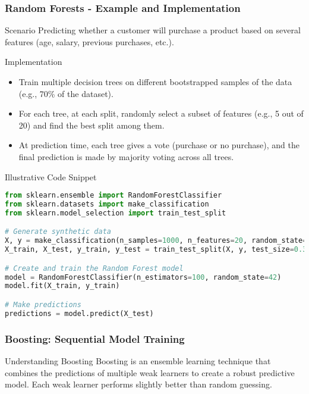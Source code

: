 \documentclass[aspectratio=169]{beamer}
\begin{document}
\begin{frame}[fragile]
    \frametitle{Random Forests - Example and Implementation}
    \begin{block}{Scenario}
        Predicting whether a customer will purchase a product based on several features (age, salary, previous purchases, etc.).
    \end{block}

    \begin{block}{Implementation}
        \begin{itemize}
            \item Train multiple decision trees on different bootstrapped samples of the data (e.g., 70\% of the dataset).
            \item For each tree, at each split, randomly select a subset of features (e.g., 5 out of 20) and find the best split among them.
            \item At prediction time, each tree gives a vote (purchase or no purchase), and the final prediction is made by majority voting across all trees.
        \end{itemize}
    \end{block}
    
    \begin{block}{Illustrative Code Snippet}
        \begin{lstlisting}[language=Python]
from sklearn.ensemble import RandomForestClassifier
from sklearn.datasets import make_classification
from sklearn.model_selection import train_test_split

# Generate synthetic data
X, y = make_classification(n_samples=1000, n_features=20, random_state=42)
X_train, X_test, y_train, y_test = train_test_split(X, y, test_size=0.3, random_state=42)

# Create and train the Random Forest model
model = RandomForestClassifier(n_estimators=100, random_state=42)
model.fit(X_train, y_train)

# Make predictions
predictions = model.predict(X_test)
        \end{lstlisting}
    \end{block}
\end{frame}

\begin{frame}[fragile]
  \frametitle{Boosting: Sequential Model Training}
  \begin{block}{Understanding Boosting}
    Boosting is an ensemble learning technique that combines the predictions of multiple weak learners to create a robust predictive model. Each weak learner performs slightly better than random guessing.
  \end{block}
\end{frame}
\end{document}

